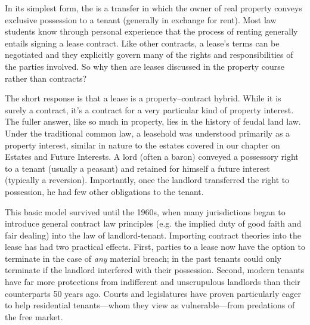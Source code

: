 In its simplest form, the  is a transfer in which the owner of real
property conveys exclusive possession to a tenant (generally in exchange for
rent).  Most law students know through personal experience that the process of
renting generally entails signing a lease contract.  Like other contracts, a
lease's terms can be negotiated and they explicitly govern many of the rights
and responsibilities of the parties involved.  So why then are leases discussed
in the property course rather than contracts?

The short response is that a lease is a property--contract hybrid. While it is
surely a contract, it's a contract for a very particular kind of property
interest. The fuller answer, like so much in property, lies in the history of
feudal land law.  Under the traditional common law, a leasehold was understood
primarily as a property interest, similar in nature to the estates covered in
our chapter on Estates and Future Interests.  A lord (often a baron) conveyed a
possessory right to a tenant (usually a peasant) and retained for himself a
future interest (typically a reversion). Importantly, once the landlord
transferred the right to possession, he had few other obligations to the
tenant.

This basic model survived until the 1960s, when many jurisdictions began to
introduce general contract law principles (e.g. the implied duty of good faith
and fair dealing) into the law of landlord-tenant.  Importing contract theories
into the lease has had two practical effects.  First, parties to a lease now
have the option to terminate in the case of \textit{any} material breach; in
the past tenants could only terminate if the landlord interfered with their
possession.  Second, modern tenants have far more protections from indifferent
and unscrupulous landlords than their counterparts 50 years ago.  Courts and
legislatures have proven particularly eager to help residential tenants---whom
they view as vulnerable---from predations of the free market. 

